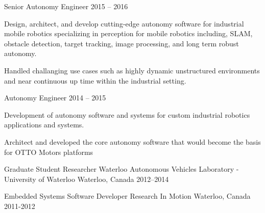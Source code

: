 \documentclass[11pt, a4paper]{awesome-cv}
\begin{document}
\begin{cventries}
\vspace*{-2mm}
\cventry
  {Senior Autonomy Engineer} 
  {}
  {}
  {2015 -- 2016}
  {
    \begin{cvitems}
      \item Design, architect, and develop cutting-edge autonomy software for industrial mobile robotics specializing in perception for mobile robotics including, SLAM, obstacle detection, target tracking, image processing, and long term robust autonomy.
      \item Handled challanging use cases such as highly dynamic unstructured environments and near continuous up time within the industrial setting.
    \end{cvitems} 
  }

\vspace*{-2mm}
\cventry
  {Autonomy Engineer} 
  {}
  {}
  {2014 -- 2015}
  {
  \begin{cvitems}
    \item Development of autonomy software and systems for custom industrial robotics applications and systems.
    \item Architect and developed the core autonomy software that would become the basis for OTTO Motors platforms
  \end{cvitems} 
  }

\cventry
  {Graduate Student Researcher} 
  {Waterloo Autonomous Vehicles Laboratory - University of Waterloo}
  {Waterloo, Canada}
  {2012--2014}
  {
  }

\vspace*{-5mm}
\cventry
  {Embedded Systems Software Developer} 
  {Research In Motion}
  {Waterloo, Canada}
  {2011-2012}
  {
  }

\end{cventries}
\end{document}
